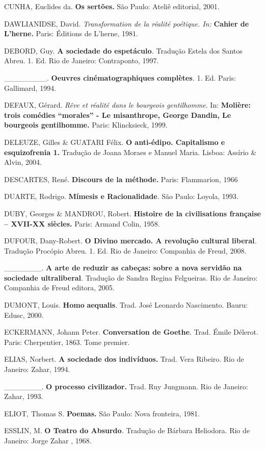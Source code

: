 CUNHA, Euclides da. \textbf{Os sertões.} São Paulo: Ateliê editorial,
2001.

DAWLIANIDSE, David. \emph{Transformation de la réalité poétique. In:}
\textbf{Cahier de L'herne.} Paris: Éditions de L'herne, 1981.

DEBORD, Guy. \textbf{A sociedade do espetáculo}\emph{.} Tradução Estela
dos Santos Abreu. 1. Ed. Rio de Janeiro: Contraponto, 1997.

\_\_\_\_\_\_\_\_. \textbf{Oeuvres cinématographiques complètes}\emph{.}
1. Ed. Paris: Gallimard, 1994.

DEFAUX, Gérard. \emph{Rêve et réalité dans le bourgeois gentilhomme}.
In: \textbf{Molière: trois comédies ``morales'' - Le misanthrope, George
Dandin, Le bourgeois gentilhomme.} Paris: Klincksieck, 1999.

DELEUZE, Gilles \& GUATARI Félix. \textbf{O anti-édipo. Capitalismo e
esquizofrenia 1.} Tradução de Joana Moraes e Manuel Maria. Lisboa:
Assírio \& Alvin, 2004.

DESCARTES, René. \textbf{Discours de la méthode.} Paris: Flammarion,
1966

DUARTE, Rodrigo. \textbf{Mímesis e Racionalidade}. São Paulo: Loyola,
1993.

DUBY, Georges \& MANDROU, Robert. \textbf{Histoire de la civilisations
française -- XVII-XX siècles.} Paris: Armand Colin, 1958.

DUFOUR, Dany-Robert. \textbf{O Divino mercado. A revolução cultural
liberal}\emph{.} Tradução Procópio Abreu. 1. Ed. Rio de Janeiro:
Companhia de Freud, 2008.

\_\_\_\_\_\_\_. \textbf{A arte de reduzir as cabeças: sobre a nova
servidão na sociedade ultraliberal}. Tradução de Sandra Regina
Felgueiras. Rio de Janeiro: Companhia de Freud editora, 2005.

DUMONT, Louis. \textbf{Homo} \textbf{aequalis}. Trad. José Leonardo
Nascimento. Bauru: Edusc, 2000.

ECKERMANN, Johann Peter. \textbf{Conversation de Goethe}. Trad. Émile
Délerot. Paris: Cherpentier, 1863. Tome premier.

ELIAS, Norbert. \textbf{A sociedade dos indivíduos.} Trad. Vera Ribeiro.
Rio de Janeiro: Zahar, 1994.

\_\_\_\_\_\_\_. \textbf{O processo civilizador.} Trad. Ruy Jungmann. Rio
de Janeiro: Zahar, 1993.

ELIOT, Thomas S. \textbf{Poemas.} São Paulo: Nova fronteira, 1981.

ESSLIN, M. \textbf{O Teatro do Absurdo}\emph{.} Tradução de Bárbara
Heliodora. Rio de Janeiro: Jorge Zahar , 1968.

